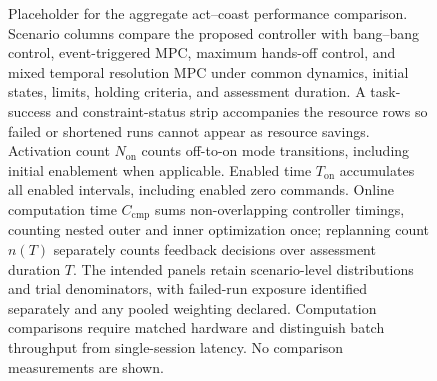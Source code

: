 \begin{figure}[t]
\centering
{}
\caption{Placeholder for the aggregate act--coast performance comparison.
Scenario columns compare the proposed controller with bang--bang control, event-triggered MPC, maximum hands-off control, and mixed temporal resolution MPC under common dynamics, initial states, limits, holding criteria, and assessment duration. A task-success and constraint-status strip accompanies the resource rows so failed or shortened runs cannot appear as resource savings. Activation count $N_{\mathrm{on}}$ counts off-to-on mode transitions, including initial enablement when applicable. Enabled time $T_{\mathrm{on}}$ accumulates all enabled intervals, including enabled zero commands. Online computation time $C_{\mathrm{cmp}}$ sums non-overlapping controller timings, counting nested outer and inner optimization once; replanning count $n(T)$ separately counts feedback decisions over assessment duration $T$. The intended panels retain scenario-level distributions and trial denominators, with failed-run exposure identified separately and any pooled weighting declared. Computation comparisons require matched hardware and distinguish batch throughput from single-session latency. No comparison measurements are shown.}
\label{fig:atlas}
\end{figure}
